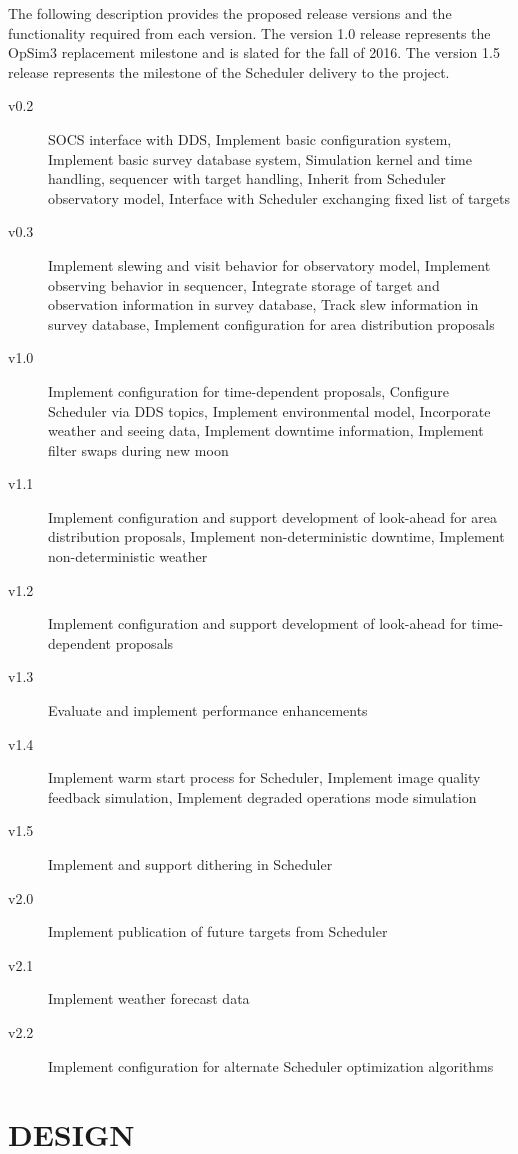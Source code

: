 \documentclass[]{spie}  %
\begin{document}
The following description provides the proposed release versions and the functionality required from each version. The version 1.0 release represents the OpSim3 replacement milestone and is slated for the fall of 2016. The version 1.5 release represents the milestone of the Scheduler delivery to the project.

\begin{description}
	\item[v0.2] SOCS interface with DDS, Implement basic configuration system, Implement basic survey database system, Simulation kernel and time handling, sequencer with target handling, Inherit from Scheduler observatory model, Interface with Scheduler exchanging fixed list of targets
	\item[v0.3] Implement slewing and visit behavior for observatory model, Implement observing behavior in sequencer, Integrate storage of target and observation information in survey database, Track slew information in survey database, Implement configuration for area distribution proposals
	\item[v1.0] Implement configuration for time-dependent proposals, Configure Scheduler via DDS topics, Implement environmental model, Incorporate weather and seeing data, Implement downtime information, Implement filter swaps during new moon
	\item[v1.1] Implement configuration and support development of look-ahead for area distribution proposals, Implement non-deterministic downtime, Implement non-deterministic weather
	\item[v1.2] Implement configuration and support development of look-ahead for time-dependent proposals
	\item[v1.3] Evaluate and implement performance enhancements
	\item[v1.4] Implement warm start process for Scheduler, Implement image quality feedback simulation, Implement degraded operations mode simulation
	\item[v1.5] Implement and support dithering in Scheduler
	\item[v2.0] Implement publication of future targets from Scheduler
	\item[v2.1] Implement weather forecast data
	\item[v2.2] Implement configuration for alternate Scheduler optimization algorithms
\end{description}

\section{DESIGN}
\end{document}
